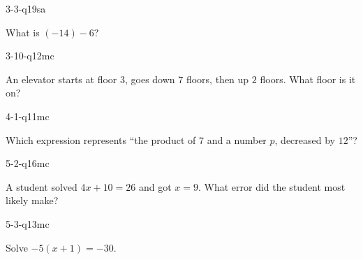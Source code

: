 \begin{practiceQuestion}{3-3-q19}{sa}
\begin{questionText}
What is $(-14) - 6$?
\end{questionText}
\end{practiceQuestion}

\begin{practiceQuestion}{3-10-q12}{mc}
\begin{questionText}
An elevator starts at floor $3$, goes down $7$ floors, then up $2$ floors. What floor is it on?
\end{questionText}
\end{practiceQuestion}

\begin{practiceQuestion}{4-1-q11}{mc}
\begin{questionText}
Which expression represents ``the product of $7$ and a number $p$, decreased by $12$''?
\end{questionText}
\end{practiceQuestion}

\begin{practiceQuestion}{5-2-q16}{mc}
\begin{questionText}
A student solved $4x + 10 = 26$ and got $x = 9$. What error did the student most likely make?
\end{questionText}
\end{practiceQuestion}

\begin{practiceQuestion}{5-3-q13}{mc}
\begin{questionText}
Solve $-5(x + 1) = -30$.
\end{questionText}
\end{practiceQuestion}

